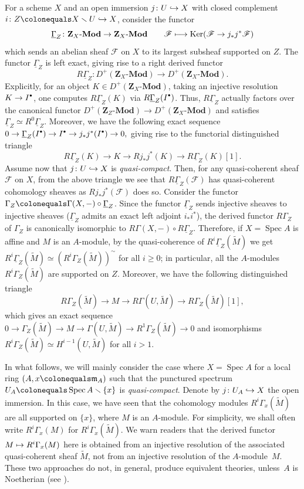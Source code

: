 \documentclass[JEP,XML,SOM,Unicode,published]{cedram}
\newcommand\mto{\mathchoice{\longmapsto}{\mapsto}{\mapsto}{\mapsto}}
\newcommand\hto{\mathrel{\lhook\joinrel\to}}
\newcommand{\sbullet}{{\scriptscriptstyle\bullet}}
\newcommand{\csbullet}{{\raisebox{1pt}{$\sbullet$}}}
\let\backslash\smallsetminus
\newcommand{\GG}{\Gamma}
\newcommand{\fm}{\mathfrak{m}}
\newcommand{\sF}{\mathscr{F}}
\let\hra\hto
\let\wt\widetilde
\let\un\underline
\let\ce\colonequals
\let\x\text
\newcommand{\qq}{\quad\quad}
\DeclareMathOperator{\Ker}{Ker}
\DeclareMathOperator{\Spec}{Spec}
\providecommand{\SP}[1]{\cite[\href{https://stacks.math.columbia.edu/tag/#1}{#1}]{SP}}
\theoremstyle{plain}
\theoremstyle{definition}
\begin{document}
For a scheme $X$ and an open immersion $j\colon U\hto X$ with closed complement $i\colon Z\ce X\backslash U\hto X$, consider the functor
\[
\un{\GG}_Z\colon \mathbf{Z}_X\x{-}\mathbf{Mod} \to \mathbf{Z}_X\x{-}\mathbf{Mod} \qq \sF \mto \Ker(\sF\to j_*j^*\sF)
\]
which sends an abelian sheaf $\sF$ on $X$ to its largest subsheaf supported on $Z$.
The functor $\un{\GG}_Z$ is left exact, giving rise to a right derived functor
\[
R\underline{\GG}_Z:D^+(\mathbf{Z}_X\x{-}\mathbf{Mod})\to D^+(\mathbf{Z}_X\x{-}\mathbf{Mod}).
\]
Explicitly, for an object $K\in D^+(\mathbf{Z}_X\x{-}\mathbf{Mod})$, taking an injective resolution $K\to I^{\csbullet}$, one computes $R\un{\GG}_Z(K)$ via $R\un{\GG}_Z(I^{\csbullet})$.
Thus, $R\un{\GG}_Z$ actually factors over the canonical functor $D^+(\mathbf{Z}_Z\x{-}\mathbf{Mod})\to D^+(\mathbf{Z}_X\x{-}\mathbf{Mod})$ and satisfies $\un{\GG}_Z\simeq R^0\un{\GG}_Z$. Moreover, we have the following exact sequence
$
0\to \un{\GG}_Z(I^{\csbullet})\to I^{\csbullet} \to j_*j^*(I^{\csbullet})\to 0,
$
giving rise to the functorial distinguished triangle
\[
R\un{\GG}_Z(K)\to K \to Rj_*j^*(K)\to R\un{\GG}_Z(K)[1].
\]
{Assume now that $j\colon U\hra X$ is \emph{quasi-compact}.} Then, for any quasi-coherent sheaf $\sF$ on $X$, from the above triangle we see that $R\underline{\GG}_Z(\sF)$ has quasi-coherent cohomology sheaves as $Rj_*j^*(\sF)$ does so.
Consider the functor $\GG_Z\ce \GG(X,-)\circ \underline{\GG}_Z$.
Since the functor $\underline{\GG}_Z$ sends injective sheaves to injective sheaves ($\underline{\GG}_Z$ admits an exact left adjoint $i_*i^*$), the derived functor $R\GG_Z$ of $\GG_Z$ is canonically isomorphic to $ R\GG(X,-)\circ R\underline{\GG}_Z$.
Therefore, if $X=\Spec A$ is affine and $M$ is an $A$\nobreakdash-mod\-ule, by the quasi-coherence of $R^i\underline{\GG}_Z(\wt{M})$ we get $R^i\underline{\GG}_Z(\wt{M}) \simeq (R^i\GG_Z(\wt{M}))^{\sim}$ for all $i\ge 0$; in particular, all the $A$\nobreakdash-mod\-ules $R^i\GG_Z(\wt{M})$ are supported on $Z$. Moreover, we have the following distinguished triangle
\[
R\GG_Z(\wt{M})\to M \to R\GG(U,\wt{M})\to R\GG_Z(\wt{M})[1],
\]
which gives an exact sequence $0\to \GG_Z(\wt{M})\to M \to \GG(U,\wt{M})\to R^1\GG_Z(\wt{M})\to 0$ and isomorphisms $R^i\GG_Z(\wt{M}) \simeq H^{i-1}(U,\wt{M})$ for all $i>1$.

In what follows, we will mainly consider the case where $X=\Spec A$ for a local ring $(A,x\ce \fm_A)$ such that the punctured spectrum $U_A\ce \Spec A\backslash \{x\}$ is \emph{quasi-compact}.
Denote by $j\colon U_A\hra X$ the open immersion. In this case, we have seen that the cohomology modules $R^i\GG_x(\wt{M})$ are all supported on $\{x\}$, where $M$ is an $A$\nobreakdash-mod\-ule.
For simplicity, we shall often write $R^i\GG_x(M)$ for $R^i\GG_x(\wt{M})$. We warn readers that the derived functor $M\mto R^i\GG_x(M)$ here is obtained from an injective resolution of the associated quasi-coherent sheaf $\wt{M}$, not from an injective resolution of the $A$\nobreakdash-mod\-ule~$M$. These two approaches do not, in general, produce equivalent theories, unless~$A$ is Noetherian (see \SP{0A6P}).
\end{document}
